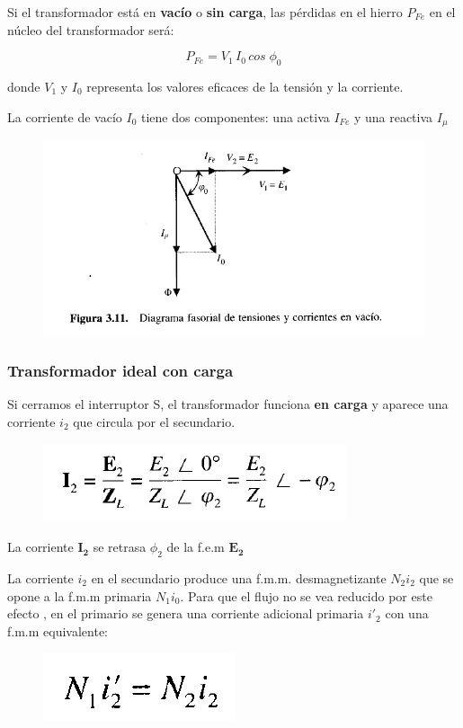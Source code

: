Si el transformador está en \textbf{vacío} o \textbf{sin carga}, las pérdidas en el hierro $P_{Fe}$ en el núcleo del transformador será:

\begin{equation}
	P_{Fe} = V_{1}\,I_{0}\,cos\;\phi_{0}
\end{equation}

donde $V_{1}$ y $I_{0}$ representa los valores eficaces de la tensión y la corriente.

La corriente de vacío $I_{0}$ tiene dos componentes: una activa $I_{Fe}$ y una reactiva $I_{\mu}$

 \begin{figure}[!htbp]
	\centering
	\includegraphics[width=0.70\linewidth]{"../Figuras/7"}
\end{figure} 

\subsubsection{Transformador ideal con carga}

Si cerramos el interruptor S, el transformador funciona \textbf{en carga} y aparece una corriente $i_{2}$ que circula por el secundario.
 \begin{figure}[!htbp]
	\centering
	\includegraphics[width=0.30\linewidth]{"../Figuras/8"}
\end{figure} 

La corriente $\mathbf{I_{2}}$ se retrasa $\phi_{2}$ de la f.e.m $\mathbf{E_{2}}$

La corriente $i_{2}$ en el secundario produce una f.m.m. desmagnetizante $N_{2}i_{2}$ que se opone a la f.m.m primaria $N_{1}i_{0}$. Para que el flujo no se vea reducido por este efecto , en el primario se genera una corriente adicional primaria $i'_{2}$ con una f.m.m equivalente:

 \begin{figure}[H]
	\centering
	\includegraphics[width=0.18\linewidth]{"../Figuras/9"}
\end{figure} 

